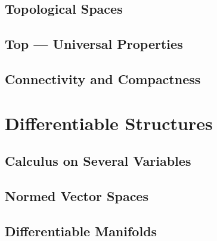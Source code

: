 \chapter{Topological Spaces}









\chapter{\textbf{Top} --- Universal Properties}





\chapter{Connectivity and Compactness}



\part{Differentiable Structures}

\chapter{Calculus on Several Variables}







\chapter{Normed Vector Spaces}



\chapter{Differentiable Manifolds}




\backmatter

\printbibliography


